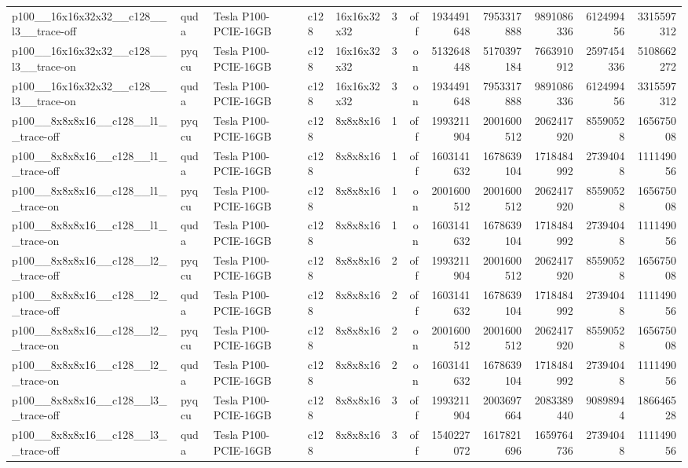 \begin{table}[htbp]
\begin{tabular}{@{}lllllrrrrrrr@{}}
p100\_\_16x16x32x32\_\_c128\_\_l3\_\_trace-off & quda & Tesla P100-PCIE-16GB & c128 & 16x16x32x32 & 3 & off & 1934491648 & 7953317888 & 9891086336 & 612499456 & 3315597312 \\
p100\_\_16x16x32x32\_\_c128\_\_l3\_\_trace-on & pyqcu & Tesla P100-PCIE-16GB & c128 & 16x16x32x32 & 3 & on & 5132648448 & 5170397184 & 7663910912 & 2597454336 & 5108662272 \\
p100\_\_16x16x32x32\_\_c128\_\_l3\_\_trace-on & quda & Tesla P100-PCIE-16GB & c128 & 16x16x32x32 & 3 & on & 1934491648 & 7953317888 & 9891086336 & 612499456 & 3315597312 \\
p100\_\_8x8x8x16\_\_c128\_\_l1\_\_trace-off & pyqcu & Tesla P100-PCIE-16GB & c128 & 8x8x8x16 & 1 & off & 1993211904 & 2001600512 & 2062417920 & 85590528 & 165675008 \\
p100\_\_8x8x8x16\_\_c128\_\_l1\_\_trace-off & quda & Tesla P100-PCIE-16GB & c128 & 8x8x8x16 & 1 & off & 1603141632 & 1678639104 & 1718484992 & 27394048 & 111149056 \\
p100\_\_8x8x8x16\_\_c128\_\_l1\_\_trace-on & pyqcu & Tesla P100-PCIE-16GB & c128 & 8x8x8x16 & 1 & on & 2001600512 & 2001600512 & 2062417920 & 85590528 & 165675008 \\
p100\_\_8x8x8x16\_\_c128\_\_l1\_\_trace-on & quda & Tesla P100-PCIE-16GB & c128 & 8x8x8x16 & 1 & on & 1603141632 & 1678639104 & 1718484992 & 27394048 & 111149056 \\
p100\_\_8x8x8x16\_\_c128\_\_l2\_\_trace-off & pyqcu & Tesla P100-PCIE-16GB & c128 & 8x8x8x16 & 2 & off & 1993211904 & 2001600512 & 2062417920 & 85590528 & 165675008 \\
p100\_\_8x8x8x16\_\_c128\_\_l2\_\_trace-off & quda & Tesla P100-PCIE-16GB & c128 & 8x8x8x16 & 2 & off & 1603141632 & 1678639104 & 1718484992 & 27394048 & 111149056 \\
p100\_\_8x8x8x16\_\_c128\_\_l2\_\_trace-on & pyqcu & Tesla P100-PCIE-16GB & c128 & 8x8x8x16 & 2 & on & 2001600512 & 2001600512 & 2062417920 & 85590528 & 165675008 \\
p100\_\_8x8x8x16\_\_c128\_\_l2\_\_trace-on & quda & Tesla P100-PCIE-16GB & c128 & 8x8x8x16 & 2 & on & 1603141632 & 1678639104 & 1718484992 & 27394048 & 111149056 \\
p100\_\_8x8x8x16\_\_c128\_\_l3\_\_trace-off & pyqcu & Tesla P100-PCIE-16GB & c128 & 8x8x8x16 & 3 & off & 1993211904 & 2003697664 & 2083389440 & 90898944 & 186646528 \\
p100\_\_8x8x8x16\_\_c128\_\_l3\_\_trace-off & quda & Tesla P100-PCIE-16GB & c128 & 8x8x8x16 & 3 & off & 1540227072 & 1617821696 & 1659764736 & 27394048 & 111149056 \\

\end{tabular}
\end{table}
